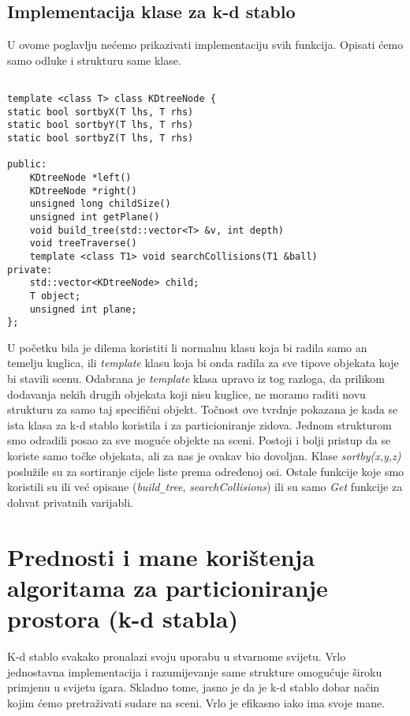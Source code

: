 \subsection{Implementacija klase za k-d stablo}
U ovome poglavlju nećemo prikazivati implementaciju svih funkcija. Opisati ćemo samo odluke i strukturu same klase.
\begin{lstlisting}[style = myC++, label = {code:13}, caption={Implementacija klase za k-d stablo}]

template <class T> class KDtreeNode {
static bool sortbyX(T lhs, T rhs) 
static bool sortbyY(T lhs, T rhs) 
static bool sortbyZ(T lhs, T rhs) 

public:
	KDtreeNode *left()
	KDtreeNode *right() 
	unsigned long childSize() 
	unsigned int getPlane()
	void build_tree(std::vector<T> &v, int depth) 
	void treeTraverse() 
	template <class T1> void searchCollisions(T1 &ball)
private:
	std::vector<KDtreeNode> child;
	T object;
	unsigned int plane;
};

\end{lstlisting}

U početku bila je dilema koristiti li normalnu klasu koja bi radila samo an temelju kuglica, ili \emph{template} klasu koja bi onda radila za sve tipove objekata koje bi stavili scenu. Odabrana je \emph{template} klasa upravo iz tog razloga, da prilikom dodavanja nekih drugih objekata koji nisu kuglice, ne moramo raditi novu strukturu za samo taj specifični objekt. Točnost ove tvrdnje pokazana je kada se ista klasa za k-d stablo koristila i za particioniranje zidova. Jednom strukturom smo odradili posao za sve moguće objekte na sceni. Postoji i bolji pristup da se koriste samo točke objekata, ali za nas je ovakav bio dovoljan. Klase \emph{sortby(x,y,z)} poslužile su za sortiranje cijele liste prema određenoj osi. Ostale funkcije koje smo koristili su ili već opisane (\emph{build\texttt{\_}tree}, \emph{searchCollisions}) ili su samo \emph{Get} funkcije za dohvat privatnih varijabli. \newpage
\section{Prednosti i mane korištenja algoritama za particioniranje prostora (k-d stabla)}

K-d stablo svakako pronalazi svoju uporabu u stvarnome svijetu. Vrlo jednostavna implementacija i razumijevanje same strukture omogućuje široku primjenu u svijetu igara. Skladno tome, jasno je da je k-d stablo dobar način kojim ćemo pretraživati sudare na sceni. Vrlo je efikasno iako ima svoje mane. 

